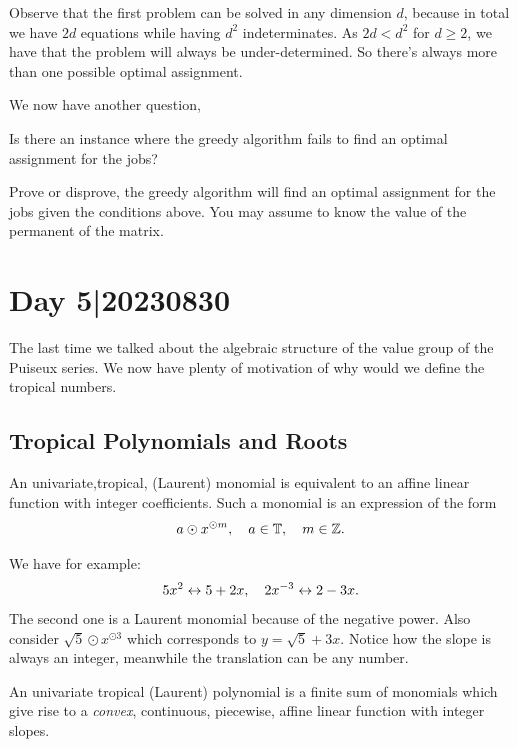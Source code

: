 \documentclass[12pt]{memoir}
\begin{document}
\begin{Rmk}
Observe that the first problem can be solved in any dimension $d$, because in total we have $2d$ equations while having $d^2$ indeterminates. As $2d<d^2$ for $d\geq 2$, we have that the problem will always be under-determined. So there's always more than one possible optimal assignment. 
\end{Rmk}

We now have another question, 
\begin{significant}
    Is there an instance where the greedy algorithm fails to find an optimal assignment for the jobs?
\end{significant}

\begin{Ej}[5]
Prove or disprove, the greedy algorithm will find an optimal assignment for the jobs given the conditions above. You may assume to know the value of the permanent of the matrix.
\end{Ej}
\section{Day 5|20230830}

The last time we talked about the algebraic structure of the value group of the Puiseux series. We now have plenty of motivation of why would we define the tropical numbers. 

\subsection{Tropical Polynomials and Roots}

An univariate,tropical, (Laurent) monomial is equivalent to an affine linear function with integer coefficients. Such a monomial is an expression of the form 
$$a\odot x^{\odot m},\quad a\in\mathbb{T},\quad m\in\mathbb{Z}.$$

\begin{Ex}
    We have for example:
    $$5x^2\leftrightarrow 5+2x,\quad 2x^{-3}\leftrightarrow 2-3x.$$
    The second one is a Laurent monomial because of the negative power. Also consider $\sqrt 5\odot x^{\odot 3}$ which corresponds to $y=\sqrt{5}+3x$. Notice how the slope is always an integer, meanwhile the translation can be any number.
\end{Ex}

An univariate tropical (Laurent) polynomial is a finite sum of monomials which give rise to a \emph{convex}, continuous, piecewise, affine linear function with integer slopes. 
\end{document}
